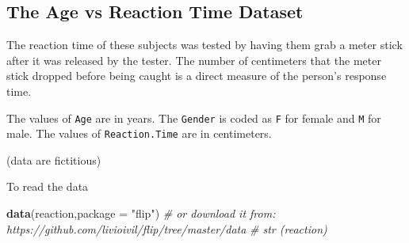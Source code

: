 \documentclass[]{article}
\newenvironment{Shaded}{\begin{snugshade}}{\end{snugshade}}
\newcommand{\CommentTok}[1]{\textcolor[rgb]{0.56,0.35,0.01}{\textit{#1}}}
\newcommand{\DataTypeTok}[1]{\textcolor[rgb]{0.13,0.29,0.53}{#1}}
\newcommand{\DecValTok}[1]{\textcolor[rgb]{0.00,0.00,0.81}{#1}}
\newcommand{\FloatTok}[1]{\textcolor[rgb]{0.00,0.00,0.81}{#1}}
\newcommand{\KeywordTok}[1]{\textcolor[rgb]{0.13,0.29,0.53}{\textbf{#1}}}
\newcommand{\NormalTok}[1]{#1}
\newcommand{\OperatorTok}[1]{\textcolor[rgb]{0.81,0.36,0.00}{\textbf{#1}}}
\newcommand{\OtherTok}[1]{\textcolor[rgb]{0.56,0.35,0.01}{#1}}
\newcommand{\StringTok}[1]{\textcolor[rgb]{0.31,0.60,0.02}{#1}}
\begin{document}
\begin{Shaded}
\end{Shaded}

\hypertarget{the-age-vs-reaction-time-dataset}{%
\subsection{The Age vs Reaction Time
Dataset}\label{the-age-vs-reaction-time-dataset}}

The reaction time of these subjects was tested by having them grab a
meter stick after it was released by the tester. The number of
centimeters that the meter stick dropped before being caught is a direct
measure of the person's response time.

The values of \texttt{Age} are in years. The \texttt{Gender} is coded as
\texttt{F} for female and \texttt{M} for male. The values of
\texttt{Reaction.Time} are in centimeters.

(data are fictitious)

To read the data

\begin{Shaded}
\begin{Highlighting}[]
\KeywordTok{data}\NormalTok{(reaction,}\DataTypeTok{package =} \StringTok{"flip"}\NormalTok{)}
\CommentTok{# or download it from: https://github.com/livioivil/flip/tree/master/data}
\CommentTok{# str (reaction)}
\end{Highlighting}
\end{Shaded}
\end{document}
